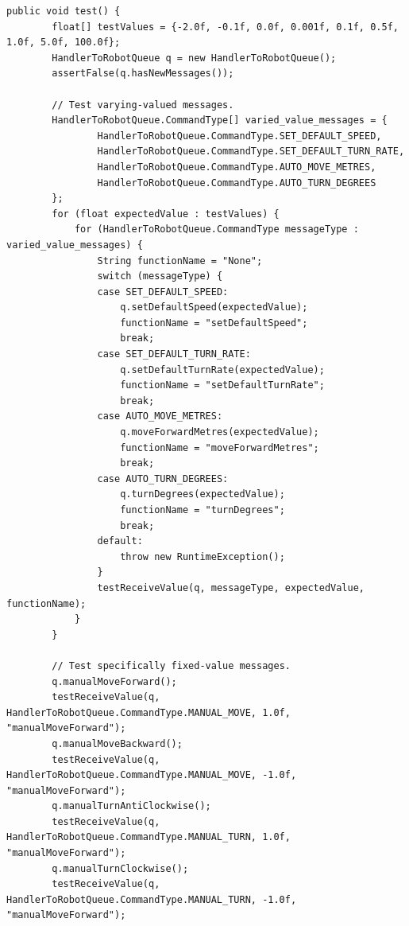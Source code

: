 \documentclass[12pt,a4paper]{article}
\begin{document}
    \begin{lstlisting}[caption=HandlerToRobotQueue automated test suite, captionpos=b, label={lst:HandlerToRobotQueueAutomatedTestSuite}]
     public void test() {
        float[] testValues = {-2.0f, -0.1f, 0.0f, 0.001f, 0.1f, 0.5f, 1.0f, 5.0f, 100.0f};
        HandlerToRobotQueue q = new HandlerToRobotQueue();
        assertFalse(q.hasNewMessages());
        
        // Test varying-valued messages.
        HandlerToRobotQueue.CommandType[] varied_value_messages = {
                HandlerToRobotQueue.CommandType.SET_DEFAULT_SPEED,
                HandlerToRobotQueue.CommandType.SET_DEFAULT_TURN_RATE,
                HandlerToRobotQueue.CommandType.AUTO_MOVE_METRES,
                HandlerToRobotQueue.CommandType.AUTO_TURN_DEGREES
        };
        for (float expectedValue : testValues) {
            for (HandlerToRobotQueue.CommandType messageType : varied_value_messages) {
                String functionName = "None";
                switch (messageType) {
                case SET_DEFAULT_SPEED:
                    q.setDefaultSpeed(expectedValue);
                    functionName = "setDefaultSpeed";
                    break;
                case SET_DEFAULT_TURN_RATE:
                    q.setDefaultTurnRate(expectedValue);
                    functionName = "setDefaultTurnRate";
                    break;
                case AUTO_MOVE_METRES:
                    q.moveForwardMetres(expectedValue);
                    functionName = "moveForwardMetres";
                    break;
                case AUTO_TURN_DEGREES:
                    q.turnDegrees(expectedValue);
                    functionName = "turnDegrees";
                    break;
                default:
                    throw new RuntimeException();
                }
                testReceiveValue(q, messageType, expectedValue, functionName);
            }
        }
        
        // Test specifically fixed-value messages.
        q.manualMoveForward();
        testReceiveValue(q, HandlerToRobotQueue.CommandType.MANUAL_MOVE, 1.0f, "manualMoveForward");
        q.manualMoveBackward();
        testReceiveValue(q, HandlerToRobotQueue.CommandType.MANUAL_MOVE, -1.0f, "manualMoveForward");
        q.manualTurnAntiClockwise();
        testReceiveValue(q, HandlerToRobotQueue.CommandType.MANUAL_TURN, 1.0f, "manualMoveForward");
        q.manualTurnClockwise();
        testReceiveValue(q, HandlerToRobotQueue.CommandType.MANUAL_TURN, -1.0f, "manualMoveForward");
    

\end{lstlisting}
\end{document}
